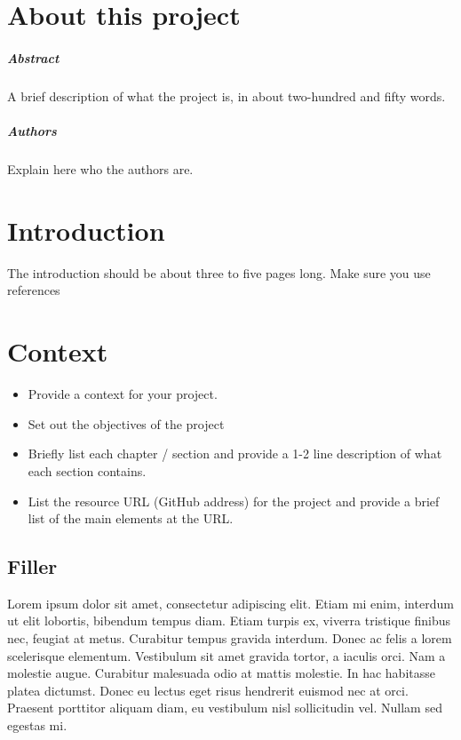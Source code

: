 
\chapter*{About this project}
\paragraph{Abstract}
A brief description of what the project is, in about two-hundred and fifty words.

\paragraph{Authors}
Explain here who the authors are.



\chapter{Introduction}
The introduction should be about three to five pages long.
Make sure you use references~\cite{einstein}

\chapter{Context}
\begin{itemize}
\item Provide a context for your project.
\item Set out the objectives of the project
\item Briefly list each chapter / section and provide a 1-2 line description of what each section contains.
\item List the resource URL (GitHub address) for the project and provide a brief list of the main elements at the URL.
\end{itemize}

\section{Filler}
Lorem ipsum dolor sit amet, consectetur adipiscing elit. Etiam mi enim, interdum ut elit lobortis, bibendum tempus diam. Etiam turpis ex, viverra tristique finibus nec, feugiat at metus. Curabitur tempus gravida interdum. Donec ac felis a lorem scelerisque elementum. Vestibulum sit amet gravida tortor, a iaculis orci. Nam a molestie augue. Curabitur malesuada odio at mattis molestie. In hac habitasse platea dictumst. Donec eu lectus eget risus hendrerit euismod nec at orci. Praesent porttitor aliquam diam, eu vestibulum nisl sollicitudin vel. Nullam sed egestas mi.

